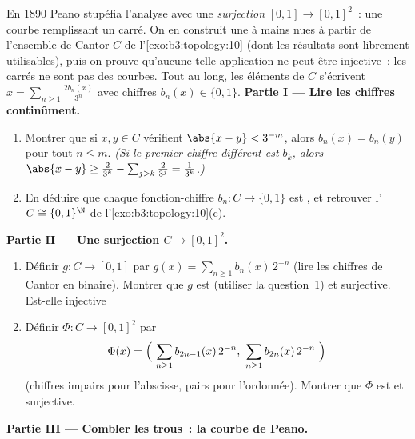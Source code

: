 \begin{problem}\label{pb:b3:topology:1}
En 1890 Peano stupéfia l'analyse avec une \emph{surjection
} $[0,1] \to [0,1]^2$~: une courbe remplissant un
carré. On en construit une à mains nues à partir de l'ensemble
de Cantor $C$ de l'\cref{exo:b3:topology:10} (dont les
résultats sont librement utilisables), puis on prouve
qu'aucune telle application ne peut être injective~: les
carrés ne sont pas des courbes. Tout au long, les éléments de
$C$ s'écrivent $x = \sum_{n \geq 1} \frac{2b_n(x)}{3^n}$ avec
chiffres $b_n(x) \in \{0, 1\}$.
\medskip
\noindent\textbf{Partie I --- Lire les chiffres
continûment.}
\begin{enumerate}
  \item Montrer que si $x, y \in C$ vérifient $\abs{x - y} <
        3^{-m}$, alors $b_n(x) = b_n(y)$ pour tout $n \leq m$.
        \emph{(Si le premier chiffre différent est $b_k$, alors
        $\abs{x - y} \geq \frac{2}{3^k} - \sum_{j>k}\frac2{3^j}
        = \frac1{3^k}$.)}
  \item En déduire que chaque fonction-chiffre $b_n \colon C
        \to \{0, 1\}$ est , et retrouver
        l' $C \cong \{0,1\}^\N$ de
        l'\cref{exo:b3:topology:10}(c).
\end{enumerate}
\medskip
\noindent\textbf{Partie II --- Une surjection  $C \to
[0,1]^2$.}
\begin{enumerate}[resume]
  \item Définir $g \colon C \to [0,1]$ par $g(x) = \sum_{n\geq1}
        b_n(x)\,2^{-n}$ (lire les chiffres de Cantor en
        binaire). Montrer que $g$ est  (utiliser la
        question~1) et surjective. Est-elle injective~
  \item Définir $\Phi \colon C \to [0,1]^2$ par
        \[
        \Phi(x) = \Bigl(\ \sum_{n\geq1} b_{2n-1}(x)\,2^{-n},\
        \sum_{n\geq1} b_{2n}(x)\,2^{-n}\ \Bigr)
        \]
        (chiffres impairs pour l'abscisse, pairs pour
        l'ordonnée). Montrer que $\Phi$ est  et
        surjective.
\end{enumerate}
\medskip
\noindent\textbf{Partie III --- Combler les trous~: la courbe
de Peano.}
\begin{enumerate}[resume]

\end{enumerate}
\end{problem}
